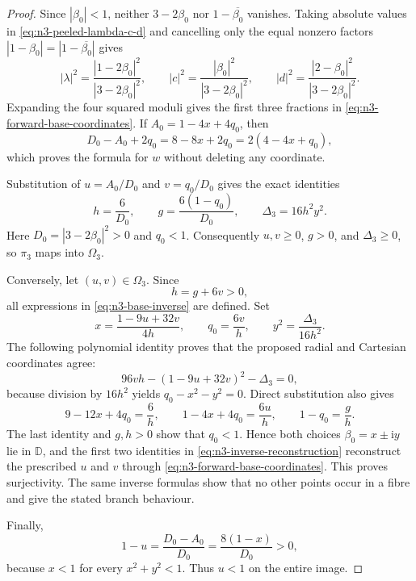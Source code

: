 \begin{proof}
Since $|\beta_0|<1$, neither $3-2\beta_0$ nor $1-\overline{\beta_0}$ vanishes.
Taking absolute values in \eqref{eq:n3-peeled-lambda-c-d} and cancelling only the
equal nonzero factors $|1-\beta_0|=|1-\overline{\beta_0}|$ gives
\[
 |\lambda|^2=\frac{|1-2\beta_0|^2}{|3-2\beta_0|^2},
 \qquad
 |c|^2=\frac{|\beta_0|^2}{|3-2\beta_0|^2},
 \qquad
 |d|^2=\frac{|2-\beta_0|^2}{|3-2\beta_0|^2}.
\]
Expanding the four squared moduli gives the first three fractions in
\eqref{eq:n3-forward-base-coordinates}.  If
$A_0=1-4x+4q_0$, then
\[
 D_0-A_0+2q_0=8-8x+2q_0=2(4-4x+q_0),
\]
which proves the formula for $w$ without deleting any coordinate.

Substitution of $u=A_0/D_0$ and $v=q_0/D_0$ gives the exact identities
\begin{equation}
 h=\frac6{D_0},\qquad
 g=\frac{6(1-q_0)}{D_0},\qquad
 \Delta_3=16h^2y^2.
 \label{eq:n3-forward-domain-identities}
\end{equation}
Here $D_0=|3-2\beta_0|^2>0$ and $q_0<1$.  Consequently $u,v\ge0$,
$g>0$, and $\Delta_3\ge0$, so $\pi_3$ maps into $\Omega_3$.

Conversely, let $(u,v)\in\Omega_3$.  Since
\[
 h=g+6v>0,
\]
all expressions in \eqref{eq:n3-base-inverse} are defined.  Set
\[
 x=\frac{1-9u+32v}{4h},\qquad
 q_0=\frac{6v}{h},\qquad
 y^2=\frac{\Delta_3}{16h^2}.
\]
The following polynomial identity proves that the proposed radial and Cartesian
coordinates agree:
\begin{equation}
 96vh-(1-9u+32v)^2-\Delta_3=0,
 \label{eq:n3-inverse-radius-identity}
\end{equation}
because division by $16h^2$ yields $q_0-x^2-y^2=0$.  Direct substitution also
gives
\begin{equation}
 9-12x+4q_0=\frac6h,\qquad
 1-4x+4q_0=\frac{6u}{h},\qquad
 1-q_0=\frac gh.
 \label{eq:n3-inverse-reconstruction}
\end{equation}
The last identity and $g,h>0$ show that $q_0<1$.  Hence both choices
$\beta_0=x\pm\mathrm i y$ lie in $\mathbb D$, and the first two identities in
\eqref{eq:n3-inverse-reconstruction} reconstruct the prescribed $u$ and $v$
through \eqref{eq:n3-forward-base-coordinates}.  This proves surjectivity.
The same inverse formulas show that no other points occur in a fibre and give the
stated branch behaviour.

Finally,
\[
 1-u=\frac{D_0-A_0}{D_0}=\frac{8(1-x)}{D_0}>0,
\]
because $x<1$ for every $x^2+y^2<1$.  Thus $u<1$ on the entire image.
\end{proof}


